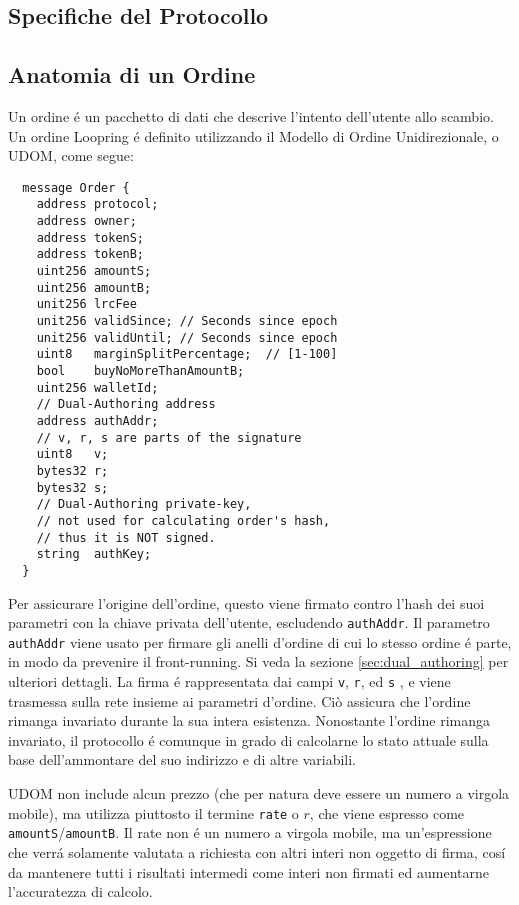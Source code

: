 \documentclass[UTF8,nofonts]{article}
\begin{document}
\begin{multicols}{2}
\section{Specifiche del Protocollo\label{sec:protocol}}

\subsection{Anatomia di un Ordine\label{anatomy}}
Un ordine \'e un pacchetto di dati che descrive l'intento dell'utente allo scambio. Un ordine Loopring  \'e definito utilizzando il Modello di Ordine Unidirezionale, o UDOM, come segue:

\begin{verbatim}
  message Order {
    address protocol;
    address owner;
    address tokenS;
    address tokenB;
    uint256 amountS;
    uint256 amountB;
    unit256 lrcFee
    unit256 validSince; // Seconds since epoch
    unit256 validUntil; // Seconds since epoch
    uint8   marginSplitPercentage;  // [1-100]
    bool    buyNoMoreThanAmountB;
    uint256 walletId;
    // Dual-Authoring address
    address authAddr;
   	// v, r, s are parts of the signature
    uint8   v;
    bytes32 r;
    bytes32 s;
    // Dual-Authoring private-key,
    // not used for calculating order's hash,
    // thus it is NOT signed.
    string  authKey;
  }
\end{verbatim}


Per assicurare l'origine dell'ordine, questo viene firmato contro l'hash dei suoi parametri con la chiave privata dell'utente, escludendo \verb|authAddr|. Il parametro \verb|authAddr| viene usato per firmare gli anelli d'ordine di cui lo stesso ordine \'e parte, in modo da prevenire il front-running. Si veda la sezione \ref{sec:dual_authoring} per ulteriori dettagli. La firma \'e rappresentata dai campi \verb|v|, \verb|r|, ed \verb|s| , e viene trasmessa sulla rete insieme ai parametri d'ordine. Ciò assicura che l'ordine rimanga invariato durante la sua intera esistenza. Nonostante l'ordine rimanga invariato, il protocollo \'e comunque in grado di calcolarne lo stato attuale sulla base dell'ammontare del suo indirizzo e di altre variabili.


UDOM non include alcun prezzo (che per natura deve essere un numero a virgola mobile), ma utilizza piuttosto il termine \verb|rate| o $r$, che viene espresso come \verb|amountS|/\verb|amountB|. Il rate non \'e un numero a virgola mobile, ma un'espressione che verr\'a solamente valutata a richiesta con altri interi non oggetto di firma, cos\'i da mantenere tutti i risultati intermedi come interi non firmati ed aumentarne l'accuratezza di calcolo.


\end{multicols}
\end{document}
